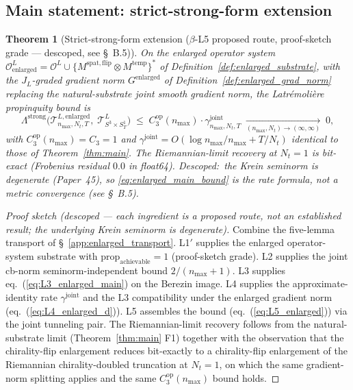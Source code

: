 \documentclass[11pt,a4paper]{article}
\theoremstyle{plain}
\newtheorem{theorem}{Theorem}[section]
\theoremstyle{definition}
\newcommand{\nmax}{n_{\max}}
\newcommand{\Nt}{N_{t}}
\newcommand{\Manifold}{S^{3}\times S^{1}_{T}}
\newcommand{\Op}{\mathcal{O}}
\newcommand{\Tcal}{\mathcal{T}}
\newcommand{\JL}{J_{L}}
\newcommand{\Lprop}{\Lambda^{\mathrm{strong}}}
\newcommand{\gammajoint}{\gamma^{\mathrm{joint}}}
\newcommand{\Cthreeop}{C_{3}^{\mathrm{op}}}
\newcommand{\prop}{\mathrm{prop}}
\newcommand{\spat}{\mathrm{spat}}
\newcommand{\temp}{\mathrm{temp}}
\begin{document}
\subsection{Main statement: strict-strong-form extension}
\label{app:enlarged_main}

\begin{theorem}[Strict-strong-form extension ($\beta$-L5 proposed route, proof-sketch grade --- descoped, see \S~B.5)]
\label{thm:enlarged_main}
On the enlarged operator system
$\Op^{L}_{\mathrm{enlarged}} = \Op^{L} \cup \{ M^{\spat,\mathrm{flip}}
\otimes M^{\temp} \}^{\ast}$ of Definition~\ref{def:enlarged_substrate},
with the $\JL$-graded gradient norm $G^{\mathrm{enlarged}}$ of
Definition~\ref{def:enlarged_grad_norm} replacing the natural-substrate
joint smooth gradient norm, the Latr\'emoli\`ere propinquity bound is
\begin{equation}\label{eq:enlarged_main_bound}
   \Lprop\!\bigl(\Tcal^{L, \mathrm{enlarged}}_{\nmax,\Nt,T},\;
                 \Tcal^{L}_{\Manifold}\bigr)
   \;\le\; \Cthreeop(\nmax) \cdot \gammajoint_{\nmax,\Nt,T}
   \;\xrightarrow[(\nmax,\Nt)\to(\infty,\infty)]{}\; 0,
\end{equation}
with $\Cthreeop(\nmax) = C_{3} = 1$ and
$\gammajoint = O(\log\nmax/\nmax + T/\Nt)$ identical to those of
Theorem~\ref{thm:main}. The Riemannian-limit recovery at $\Nt = 1$ is
bit-exact (Frobenius residual $0.0$ in float64). \emph{Descoped}:\ the
Krein seminorm is degenerate (Paper~45), so \eqref{eq:enlarged_main_bound}
is the rate formula, not a metric convergence (see \S~B.5).
\end{theorem}

\begin{proof}[Proof sketch (descoped --- each ingredient is a proposed
route, not an established result; the underlying Krein seminorm is
degenerate)]
Combine the five-lemma transport of \S~\ref{app:enlarged_transport}.
L1$'$ supplies the enlarged operator-system substrate with
$\prop_{\mathrm{achievable}} = 1$ (proof-sketch grade). L2 supplies the joint cb-norm
seminorm-independent bound $2/(\nmax + 1)$. L3 supplies
eq.~(\ref{eq:L3_enlarged_main}) on the Berezin image. L4 supplies the
approximate-identity rate $\gammajoint$ and the L3 compatibility
under the enlarged gradient norm (eq.~(\ref{eq:L4_enlarged_d})). L5
assembles the bound (eq.~(\ref{eq:L5_enlarged})) via the joint
tunneling pair. The Riemannian-limit recovery follows from the
natural-substrate limit (Theorem~\ref{thm:main} F1) together with the
observation that the chirality-flip enlargement reduces bit-exactly
to a chirality-flip enlargement of the Riemannian chirality-doubled
truncation at $\Nt = 1$, on which the same gradient-norm splitting
applies and the same $\Cthreeop(\nmax)$ bound holds. \qedhere
\end{proof}
\end{document}
